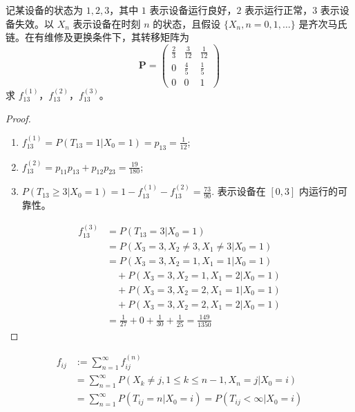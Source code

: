 \documentclass[lang=cn,10pt,thmcnt=section]{elegantbook}
\begin{document}
\begin{example}
	记某设备的状态为 $1, 2, 3$，其中 $1$ 表示设备运行良好，$2$ 表示运行正常，$3$ 表示设备失效。以 $X_n$ 表示设备在时刻 $n$ 的状态，且假设 $\{X_n, n = 0, 1, \ldots\}$ 是齐次马氏链。在有维修及更换条件下，其转移矩阵为
\[
\mathbf{P} = \begin{pmatrix}
\frac{2}{3} & \frac{3}{12} & \frac{1}{12} \\
0 & \frac{4}{5} & \frac{1}{5} \\
0 & 0 & 1
\end{pmatrix}
\]
求 $f_{13}^{(1)}$，$f_{13}^{(2)}$，$f_{13}^{(3)}$。
\end{example}
\begin{proof}
	\begin{figure}[H]
		\centering
	\end{figure}

	\begin{enumerate}
		\item $f_{13}^{(1)} = P(T_{13} = 1 | X_0 = 1) = p_{13} = \frac{1}{12}$;
		\item $f_{13}^{(2)} = p_{11} p_{13} + p_{12} p_{23} = \frac{19}{180}$;
		\item $P(T_{13} \geq 3 | X_0 = 1) = 1 - f_{13}^{(1)} - f_{13}^{(2)} = \frac{73}{90}$. 表示设备在 $[0,3]$ 内运行的可靠性。
	\end{enumerate}
	\begin{align*}
		f_{13}^{(3)} &= P(T_{13} = 3 | X_0 = 1) \\
		&= P(X_3 = 3, X_2 \neq 3, X_1 \neq 3 | X_0 = 1) \\
		&= P(X_3 = 3, X_2 = 1, X_1 = 1 | X_0 = 1) \\
		&\quad + P(X_3 = 3, X_2 = 1, X_1 = 2 | X_0 = 1) \\
		&\quad + P(X_3 = 3, X_2 = 2, X_1 = 1 | X_0 = 1) \\
		&\quad + P(X_3 = 3, X_2 = 2, X_1 = 2 | X_0 = 1) \\
		&= \frac{1}{27} + 0 + \frac{1}{30} + \frac{1}{25} = \frac{149}{1350}
		\end{align*}
\end{proof}
\begin{align*}
	f_{ij} & := \sum_{n=1}^{\infty} f_{ij}^{(n)} \\
	& = \sum_{n=1}^{\infty} P(X_k \neq j, 1 \leq k \leq n-1, X_n = j | X_0 = i) \\
	& = \sum_{n=1}^{\infty} P(T_{ij} = n | X_0 = i) = P(T_{ij} < \infty | X_0 = i)
\end{align*}
	
\end{document}
